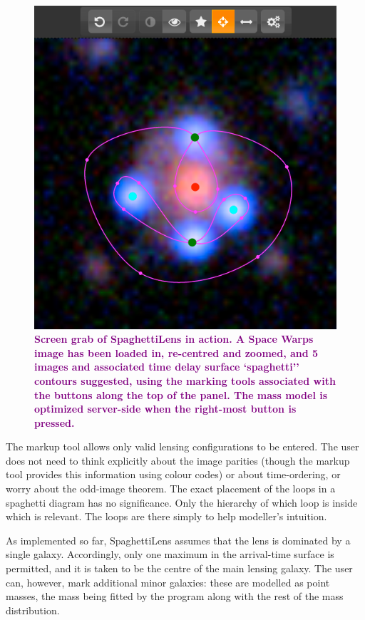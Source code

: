 \documentclass[usenatbib]{mn2e}
\newcommand{\spl}{SpaghettiLens\xspace}
\newcommand{\sw}{Space Warps\xspace}
\newcommand{\phil}[1]{\noindent\textcolor{purple}{\bf #1}}
\begin{document}
\begin{figure}
  \centering
    \includegraphics[width=0.90\linewidth]{fig/screenshot}
  \caption{\phil{Screen grab of \spl in action. A \sw image has been loaded
  in, re-centred and zoomed, and 5 images and associated time delay
  surface `spaghetti'' contours suggested, using the marking tools
  associated with the buttons along the top of the panel. The mass
  model is optimized server-side 
  when the right-most button is pressed.}}
  \label{fig:screenshot}
\end{figure}

The markup tool allows only valid lensing configurations to be
entered.  The user does not need to think explicitly about the image
parities (though the markup tool provides this information using
colour codes) or about time-ordering, or worry about the odd-image
theorem.  The exact placement of the loops in a spaghetti diagram has
no significance.  Only the hierarchy of which loop is inside which is
relevant.  The loops are there simply to help modeller's intuition.

As implemented so far, \spl assumes that the lens is dominated by a
single galaxy.  Accordingly, only one maximum in the arrival-time surface
is permitted, and it is taken to be the centre of the main lensing
galaxy.  The user can, however, mark additional minor galaxies: these
are modelled as point masses, the mass being fitted by the program along
with the rest of the mass distribution.
\end{document}
